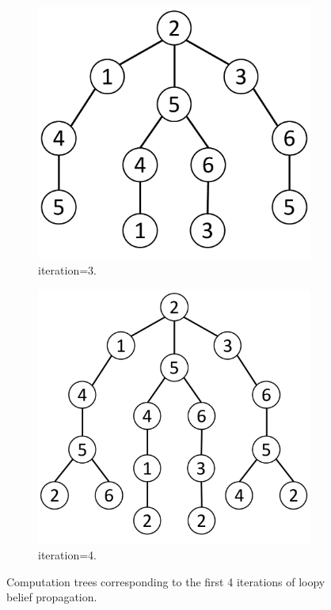 \documentclass{article}
\begin{document}
\begin{figure}[h]
\begin{subfigure}[t]{0.23\textwidth}
	\end{subfigure}
		\begin{subfigure}[t]{0.23\textwidth}
	\centering
	\includegraphics[width=\textwidth]{55a3.pdf}
	\vspace{-0.6cm}
	\caption{iteration=3.}
	\end{subfigure}
		\begin{subfigure}[t]{0.29\textwidth}
	\centering
	\includegraphics[width=\textwidth]{55a4.pdf}
	\vspace{-0.6cm}
	\caption{iteration=4.}
	\end{subfigure}
  \caption{Computation trees corresponding to the first 4
  iterations of loopy belief propagation.}
  \label{f:55a}
\end{figure}
%
\\
\end{document}
